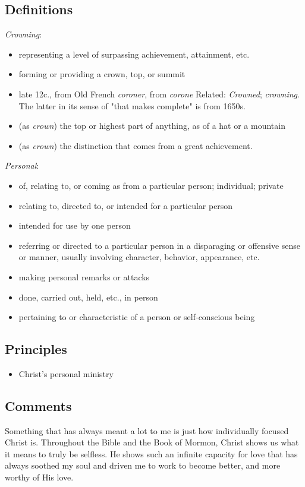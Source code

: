 \documentclass[12pt]{report}
\begin{document}
\subsection{Definitions\label{intro:DFN3}}
\emph{Crowning}: \begin{itemize}
\item representing a level of surpassing achievement, attainment, etc.
\item forming or providing a crown, top, or summit
\item late 12c., from Old French \emph{coroner}, from \emph{corone} Related: \emph{Crowned}; \emph{crowning}. The latter in its sense of "that makes complete" is from 1650s.
\item (as \emph{crown}) the top or highest part of anything, as of a hat or a mountain
\item (as \emph{crown}) the distinction that comes from a great achievement.
\end{itemize}
\emph{Personal}: \begin{itemize}
\item of, relating to, or coming as from a particular person; individual; private
\item relating to, directed to, or intended for a particular person
\item intended for use by one person
\item referring or directed to a particular person in a disparaging or offensive sense or manner, usually involving character, behavior, appearance, etc.
\item making personal remarks or attacks
\item done, carried out, held, etc., in person
\item pertaining to or characteristic of a person or self-conscious being
\end{itemize}

\subsection{Principles\label{intro:principles3}}
\begin{itemize}
\item {}Christ's personal ministry
\end{itemize}

\subsection{Comments\label{intro:comments3}}
Something that has always meant a lot to me is just how individually focused Christ is.  Throughout the Bible and the Book of Mormon, Christ shows us what it means to truly be selfless.  He shows such an infinite capacity for love that has always soothed my soul and driven me to work to become better, and more worthy of His love.  
\end{document}
